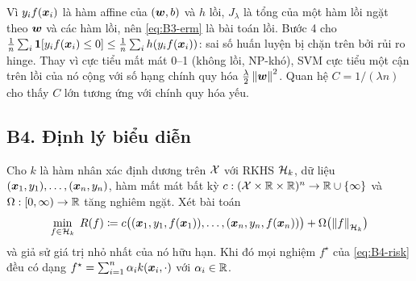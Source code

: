 \begin{remark}
Vì $y_i f(\bm{x}_i)$ là hàm affine của $(\bm{w}, b)$ và $h$ lồi, $J_\lambda$ là tổng của một hàm lồi
ngặt theo $\bm{w}$ và các hàm lồi, nên \eqref{eq:B3-erm} là bài toán lồi. Bước 4 cho
$\frac1n\sum_i \mathbf{1}\!\left[y_i f(\bm{x}_i) \le 0\right] \le \frac1n\sum_i h(y_i f(\bm{x}_i))$: sai số huấn luyện bị chặn
trên bởi rủi ro hinge. Thay vì cực tiểu mất mát 0--1 (không lồi, NP-khó), SVM cực tiểu một cận
trên lồi của nó cộng với số hạng chính quy hóa $\frac\lambda2\left\lVert \bm{w} \right\rVert^2$. Quan hệ $C = 1/(\lambda n)$
cho thấy $C$ lớn tương ứng với chính quy hóa yếu.
\end{remark}

\subsection{B4. Định lý biểu diễn}\label{sec:B4}

\begin{theorem}\label{thm:B4-representer}
Cho $k$ là hàm nhân xác định dương trên $\mathcal{X}$ với RKHS $\mathcal{H}_k$, dữ liệu
$(\bm{x}_1, y_1), \dots, (\bm{x}_n, y_n)$, hàm mất mát bất kỳ
$c : (\mathcal{X} \times \mathbb{R} \times \mathbb{R})^n \to \mathbb{R} \cup \{\infty\}$ và
$\Omega : [0, \infty) \to \mathbb{R}$ tăng nghiêm ngặt. Xét bài toán
\begin{equation}\label{eq:B4-risk}
  \min_{f \in \mathcal{H}_k} \; R(f) \coloneqq c\bigl((\bm{x}_1, y_1, f(\bm{x}_1)), \dots, (\bm{x}_n, y_n, f(\bm{x}_n))\bigr)
  + \Omega\bigl(\left\lVert f \right\rVert_{\mathcal{H}_k}\bigr)
\end{equation}
và giả sử giá trị nhỏ nhất của nó hữu hạn. Khi đó mọi nghiệm $f^\star$ của \eqref{eq:B4-risk}
đều có dạng $f^\star = \sum_{i=1}^n \alpha_i k(\bm{x}_i, \cdot)$ với $\alpha_i \in \mathbb{R}$.
\end{theorem}

